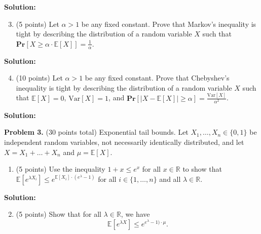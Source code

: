 \documentclass[11pt]{article}
\newcommand{\Ex}[1]{\ensuremath{\mathbb{E}\left[#1\right]}}
\newcommand{\Var}[1]{\ensuremath{\text{Var}\left[#1\right]}}
\newcommand{\PPr}[1]{\ensuremath{\mathbf{Pr}\left[#1\right]}}
\begin{document}
\noindent\textbf{Solution:}




\begin{enumerate}
\setcounter{enumi}{2}
\item (5 points)
Let $\alpha>1$ be any fixed constant. 
Prove that Markov's inequality is tight by describing the distribution of a random variable $X$ such that $\PPr{X\ge\alpha\cdot\Ex{X}}=\frac{1}{\alpha}$. 
\end{enumerate}

\noindent\textbf{Solution:}





\begin{enumerate}
\setcounter{enumi}{3}
\item (10 points)
Let $\alpha>1$ be any fixed constant. 
Prove that Chebyshev's inequality is tight by describing the distribution of a random variable $X$ such that $\Ex{X}=0$, $\Var{X}=1$, and $\PPr{|X-\Ex{X}|\ge\alpha}=\frac{\Var{X}}{\alpha^2}$. 
\end{enumerate}

\noindent\textbf{Solution:}










\newpage\noindent
\textbf{Problem 3.} (30 points total)
Exponential tail bounds.
\vskip 0.1in\noindent
Let $X_1,\ldots,X_n\in\{0,1\}$ be independent random variables, not necessarily identically distributed, and let $X=X_1+\ldots+X_n$ and $\mu=\Ex{X}$. 
\begin{enumerate}
\item (5 points)
Use the inequality $1+x\le e^x$ for all $x\in\mathbb{R}$ to show that $\Ex{e^{\lambda X_i}}\le e^{\Ex{X_i}\cdot(e^\lambda-1)}$ for all $i\in\{1,\ldots,n\}$ and all $\lambda\in\mathbb{R}$. 
\end{enumerate}

\noindent\textbf{Solution:}







\begin{enumerate}
\setcounter{enumi}{1}
\item (5 points)
Show that for all $\lambda\in\mathbb{R}$, we have 
\[\Ex{e^{\lambda X}}\le e^{e^\lambda-1)\cdot\mu}.\]
\end{enumerate}
\end{document}
